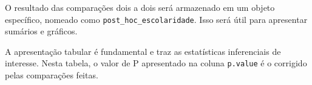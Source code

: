 \documentclass[
]{book}
\newenvironment{Shaded}{\begin{snugshade}}{\end{snugshade}}
\newcommand{\DataTypeTok}[1]{\textcolor[rgb]{0.13,0.29,0.53}{#1}}
\newcommand{\KeywordTok}[1]{\textcolor[rgb]{0.13,0.29,0.53}{\textbf{#1}}}
\newcommand{\NormalTok}[1]{#1}
\newcommand{\OperatorTok}[1]{\textcolor[rgb]{0.81,0.36,0.00}{\textbf{#1}}}
\newcommand{\OtherTok}[1]{\textcolor[rgb]{0.56,0.35,0.01}{#1}}
\newcommand{\StringTok}[1]{\textcolor[rgb]{0.31,0.60,0.02}{#1}}
\begin{document}
O resultado das comparações dois a dois será armazenado em um objeto
específico, nomeado como \texttt{post\_hoc\_escolaridade}. Isso será
útil para apresentar sumários e gráficos.

\begin{Shaded}
\end{Shaded}

A apresentação tabular é fundamental e traz as estatísticas inferenciais
de interesse. Nesta tabela, o valor de P apresentado na coluna
\texttt{p.value} é o corrigido pelas comparações feitas.

\begin{Shaded}
\end{Shaded}
\end{document}
